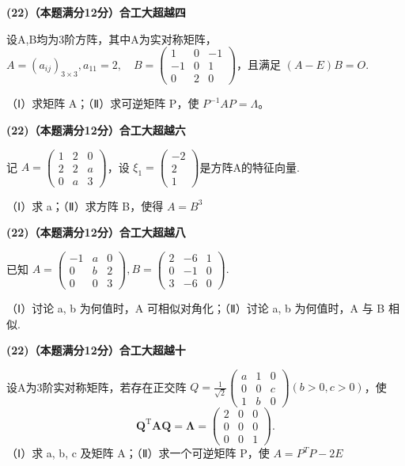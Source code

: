 \documentclass[a4paper,12pt]{article}
\begin{document}
\vspace{0.5cm}

\textbf{(22)（本题满分12分）合工大超越四}

设A,B均为3阶方阵，其中A为实对称矩阵， $A=(a_{ij})_{3\times3},a_{11}=2,\quad B=\begin{pmatrix}1&0&-1\\-1&0&1\\0&2&0\end{pmatrix}$，且满足 $(A-E)B=O.$

（Ⅰ）求矩阵 A；（Ⅱ）求可逆矩阵 P，使 $P^{-1}AP=\Lambda$。

\vspace{0.5cm}

\textbf{(22)（本题满分12分）合工大超越六}

记 $A=\begin{pmatrix}1&2&0\\2&2&a\\0&a&3\end{pmatrix}$，设 $\xi_{1}=\begin{pmatrix}-2\\2\\1\end{pmatrix}$是方阵A的特征向量.

（Ⅰ）求 a；（Ⅱ）求方阵 B，使得 $A = B^{3}$

\vspace{0.5cm}

\textbf{(22)（本题满分12分）合工大超越八}

已知 $A=\begin{pmatrix}-1&a&0\\0&b&2\\0&0&3\end{pmatrix},B=\begin{pmatrix}2&-6&1\\0&-1&0\\3&-6&0\end{pmatrix}.$

（Ⅰ）讨论 a, b 为何值时，A 可相似对角化；（Ⅱ）讨论 a, b 为何值时，A 与 B 相似.

\vspace{0.5cm}

\textbf{(22)（本题满分12分）合工大超越十}

设A为3阶实对称矩阵，若存在正交阵 $Q=\frac{1}{\sqrt{2}}\begin{pmatrix}a&1&0\\0&0&c\\1&b&0\end{pmatrix}(b>0,c>0)$，使
\[ \boldsymbol{Q}^{\mathrm{T}}\boldsymbol{A}\boldsymbol{Q}=\boldsymbol{\Lambda}=\begin{pmatrix}{{{2}}}&{{{0}}}&{{{0}}} \\{{{0}}}&{{{0}}}&{{{0}}} \\{{{0}}}&{{{0}}}&{{{1}}}\end{pmatrix}. \]
（Ⅰ）求 a, b, c 及矩阵 A；（Ⅱ）求一个可逆矩阵 P，使 $A = P^{T} P - 2 E$
\end{document}
